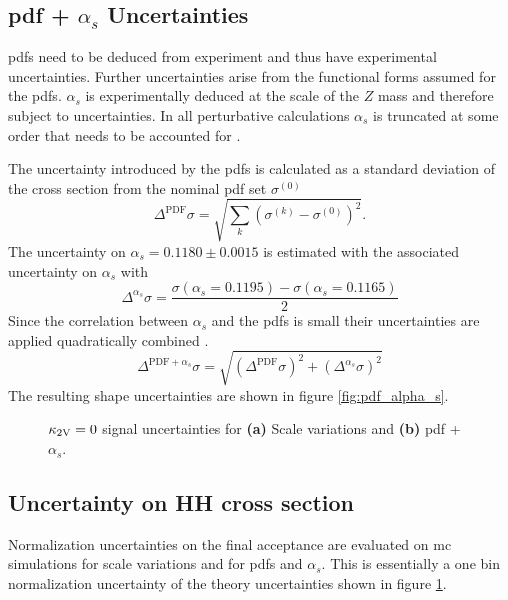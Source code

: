 \subsection{\ac{pdf} + $\alpha_s$ Uncertainties}
\acp{pdf} need to be deduced from experiment and thus have experimental uncertainties. Further uncertainties arise from the functional forms assumed for the \acp{pdf}. $\alpha_s$ is  experimentally deduced at the scale of the $Z$ mass and therefore subject to uncertainties. In all perturbative calculations $\alpha_s$ is truncated at some order that needs to be accounted for \citep{unc_recipe,Butterworth_2016}.

The uncertainty introduced by the \acp{pdf} is calculated as a standard deviation of the cross section from the nominal \ac{pdf} set $\sigma^{(0)}$ \citep{Butterworth_2016}
\begin{equation}
    \Delta^\text{PDF}\sigma = \sqrt{\sum_k \left(\sigma^{(k)} - \sigma^{(0)}\right)^2}.
\end{equation}
The uncertainty on $\alpha_s=0.1180\pm0.0015$ is estimated with the associated uncertainty on $\alpha_s$ with
\begin{equation}
    \Delta^{\alpha_s}\sigma = \frac{\sigma(\alpha_s=0.1195)-\sigma(\alpha_s=0.1165)}{2}
\end{equation}
Since the correlation between $\alpha_s$ and the \acp{pdf} is small their uncertainties are applied quadratically combined \citep{unc_recipe,Butterworth_2016}.
\begin{equation}
    \Delta^{\text{PDF}+\alpha_s}\sigma=\sqrt{(\Delta^\text{PDF}\sigma )^2+(\Delta^{\alpha_s}\sigma)^2}
\end{equation}
The resulting shape uncertainties are shown in figure \ref{fig:pdf_alpha_s}.

\begin{figure}
    \centering
    \caption[]{$\kappa_{\text{2V}}=0$ signal uncertainties for \textbf{(a)} Scale variations and \textbf{(b)} \ac{pdf} + $\alpha_s$.}
    \label{fig:theory_unc}
\end{figure}

\subsection{Uncertainty on HH cross section}
Normalization uncertainties on the final acceptance are evaluated on \ac{mc} simulations for scale variations and for \acp{pdf} and $\alpha_s$. This is essentially a one bin normalization uncertainty of the theory uncertainties shown in figure \ref{fig:theory_unc}.


